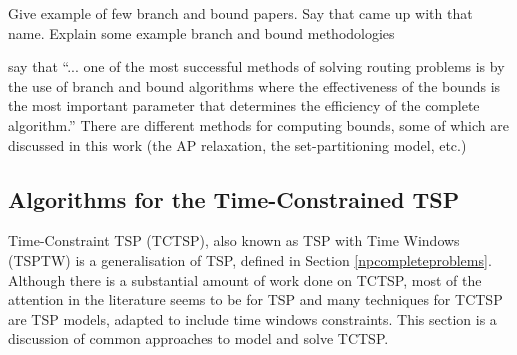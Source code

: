 \documentclass{mprop}
\theoremstyle{definition}
\begin{document}
Give example of few branch and bound papers. Say that \citet{Little63} came up with that name. Explain some example branch and bound methodologies

\citet{Christofides81} say that ``... one of the most successful methods of solving routing problems is by the use of branch and bound algorithms where the effectiveness of the bounds is the most important parameter that determines the efficiency of the complete algorithm.'' There are different methods for computing bounds, some of which are discussed in this work (the AP relaxation, the set-partitioning model, etc.)

\subsection{Algorithms for the Time-Constrained TSP}
\label{sec:tctspalgos}
Time-Constraint TSP (TCTSP), also known as TSP with Time Windows (TSPTW) is a generalisation of TSP, defined in Section \ref{npcompleteproblems}.
Although there is a substantial amount of work done on TCTSP, most of the attention in the literature seems to be for TSP \citep{tspbible} and many techniques for TCTSP are TSP models, adapted to include time windows constraints. This section is a discussion of common approaches to model and solve TCTSP.



\end{document}
